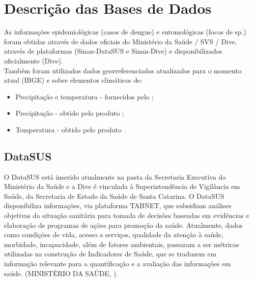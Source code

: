 


\section{Descrição das Bases de Dados}

As informações epidemiológicas (casos de dengue) e entomológicas (focos de  sp.) foram obtidas através de dados oficiais do Ministério da Saúde / \acrfull{SVS} / \acrfull{Dive}, através de plataformas  (\acrshort{Sinan}-\acrshort{DataSUS} e \acrshort{Sinan}-\acrshort{Dive}) e disponibilizados oficialmente (\acrshort{Dive}).\\
\indent Também foram utilizados dados georreferenciados atualizados para o momento atual (\acrfull{IBGE}) e sobre elementos climáticos de:
\begin{itemize}
    \item Precipitação e temperatura - fornecidos pelo ;
    \item Precipitação - obtido pelo produto ;
    \item Temperatura - obtido pelo produto .
\end{itemize}

\subsection{\acrfull{DataSUS}}

O \acrshort{DataSUS} está inserido atualmente na pasta da Secretaria Executiva do Ministério da Saúde e a \acrfull{Dive} é vinculada à Superintendência de Vigilância em Saúde, da Secretaria de Estado da Saúde de Santa Catarina. O \acrshort{DataSUS} disponibiliza informações, via plataforma TABNET, que subsidiam  análises objetivas da situação sanitária para tomada de decisões baseadas em evidências e elaboração de programas de ações para promoção da saúde. Atualmente, dados como condições de vida, acesso a serviços, qualidade da atenção à saúde, morbidade, incapacidade, além de fatores ambientais, passaram a ser métricas utilizadas na construção de Indicadores de Saúde, que se traduzem em informação relevante para a quantificação e a avaliação das informações em saúde. (MINISTÉRIO DA SAÚDE, \citeyear{TABNETMinisterio}).

